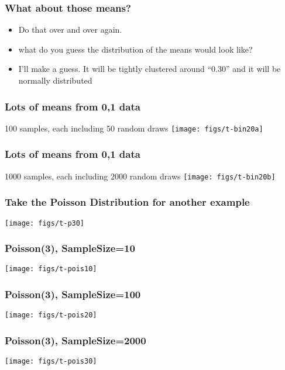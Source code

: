 \documentclass[10pt,english]{beamer}
\begin{document}
\begin{frame}
  \frametitle{What about those means?}

  \begin{itemize}
    \item Do that over and over again.
    \item what do you guess the distribution of the means would look like?
    \item I'll make a guess.  It will be tightly clustered around
      ``0.30'' and it will be normally distributed
  \end{itemize}

\end{frame}




\begin{frame}
  \frametitle{Lots of means from 0,1 data}
100 samples, each including 50 random draws
\texttt{[image: figs/t-bin20a]}

\end{frame}





\begin{frame}
  \frametitle{Lots of means from 0,1 data}
1000 samples, each including 2000 random draws
\texttt{[image: figs/t-bin20b]}

\end{frame}



\begin{frame}
 \frametitle{Take the Poisson Distribution for another example}

\texttt{[image: figs/t-p30]}
\end{frame}






\begin{frame}
 \frametitle{Poisson(3), SampleSize=10 }
 \texttt{[image: figs/t-pois10]}
\end{frame}


\begin{frame}
 \frametitle{Poisson(3), SampleSize=100 }
 \texttt{[image: figs/t-pois20]}
\end{frame}


\begin{frame}
 \frametitle{Poisson(3), SampleSize=2000 }

 \texttt{[image: figs/t-pois30]}
\end{frame}
\end{document}

